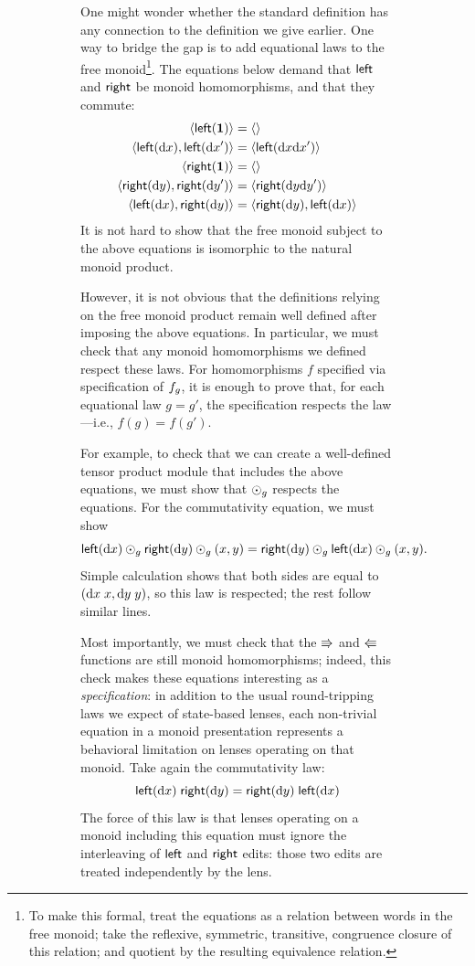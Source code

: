\begin{figure}
\begin{figure}
One might wonder whether the standard definition has any connection to the
definition we give earlier. One way to bridge the gap is to add equational
laws to the free monoid\footnote{To make this formal, treat the
equations as a relation between words in the free monoid; take the
reflexive, symmetric, transitive, congruence closure of this relation; and
quotient by the resulting equivalence relation.}. The equations below demand
that $\mathsf{left}$ and $\mathsf{right}$ be monoid homomorphisms, and that they
commute:
\begin{align*}
    \left<\mathsf{left}(\mbox{\bf{1}})\right> &= \left<\right> \\
    \left<\mathsf{left}(\textrm{d} x),\mathsf{left}(\textrm{d} x')\right> &= \left<\mathsf{left}(\textrm{d} x\textrm{d} x')\right> \\
    \left<\mathsf{right}(\mbox{\bf{1}})\right> &= \left<\right> \\
    \left<\mathsf{right}(\textrm{d} y),\mathsf{right}(\textrm{d} y')\right> &= \left<\mathsf{right}(\textrm{d} y\textrm{d} y')\right> \\
    \left<\mathsf{left}(\textrm{d} x),\mathsf{right}(\textrm{d} y)\right> &= \left<\mathsf{right}(\textrm{d} y),\mathsf{left}(\textrm{d} x)\right>
\end{align*}
It is not hard to show that the free monoid subject to the above
equations is isomorphic to the natural monoid product.

However, it is not obvious that the definitions relying on the free monoid
product remain well defined after imposing the above equations. In
particular, we must check that any monoid homomorphisms we defined respect
these laws. For homomorphisms $f$ specified via specification
of $f_g$, it is enough to prove that, for each equational law $g=g'$, the
specification respects the law---i.e., $f(g)=f(g')$.

For example, to check that we can create a well-defined tensor product
module that includes the above equations, we must show that $\odot_g$
respects the equations. For the commutativity equation, we must show 
\[\mathsf{left}(\textrm{d} x)\odot_g\mathsf{right}(\textrm{d} y)\odot_g(x,y) =
\mathsf{right}(\textrm{d} y)\odot_g\mathsf{left}(\textrm{d} x)\odot_g(x,y).\]
Simple calculation shows that both sides are equal to $(\textrm{d} x\;x,\textrm{d} y\;y)$, so
this law is respected; the rest follow similar lines.

Most importantly, we must check that the $\mathord{\Rrightarrow}$ and $\mathord{\Lleftarrow}$ functions are
still monoid homomorphisms; indeed, this check
makes these equations interesting as a {\em specification}: 
in addition to the usual round-tripping laws we expect of
state-based lenses, each non-trivial equation in a monoid presentation
represents a behavioral limitation on lenses operating on that monoid.
Take again the commutativity law:
\[\mathsf{left}(\textrm{d} x)\;\mathsf{right}(\textrm{d} y) = \mathsf{right}(\textrm{d} y)\;\mathsf{left}(\textrm{d} x)\]
The force of this law is that lenses operating on a monoid including this
equation must ignore the interleaving of $\mathsf{left}$ and $\mathsf{right}$ edits:
those two edits are treated independently by the lens.


\end{figure}
\end{figure}
